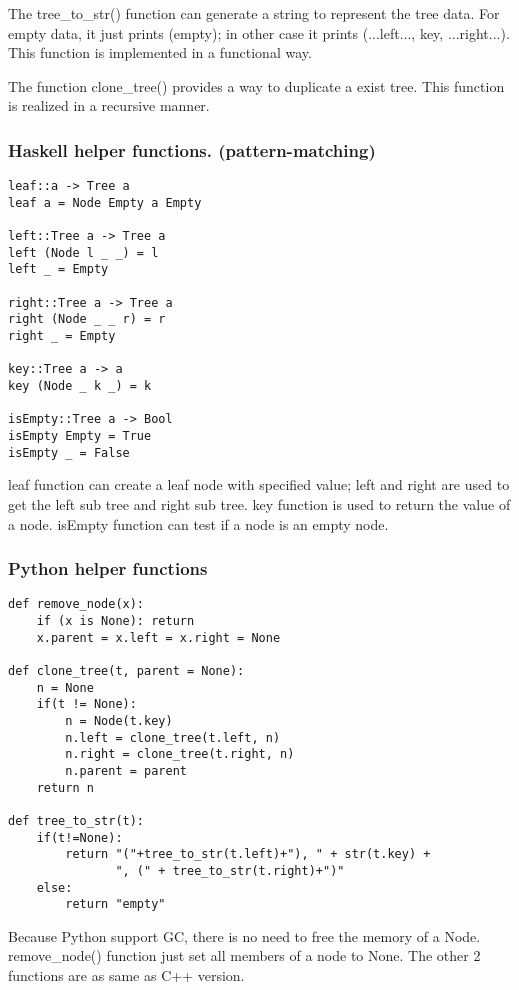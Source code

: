 \documentclass{article}
\begin{document}
The tree\_to\_str() function can generate a string
to represent the tree data. For empty data, it just prints (empty); in other case
it prints (...left..., key, ...right...). This function is implemented in a
functional way.

The function clone\_tree() provides a way to duplicate a exist tree. This
function is realized in a recursive manner.

\subsubsection*{Haskell helper functions. (pattern-matching)}
\lstset{language=Haskell}
\begin{lstlisting}
leaf::a -> Tree a
leaf a = Node Empty a Empty

left::Tree a -> Tree a
left (Node l _ _) = l
left _ = Empty

right::Tree a -> Tree a
right (Node _ _ r) = r
right _ = Empty

key::Tree a -> a
key (Node _ k _) = k

isEmpty::Tree a -> Bool
isEmpty Empty = True
isEmpty _ = False
\end{lstlisting}

leaf function can create a leaf node with specified value; left and right
are used to get the left sub tree and right sub tree. key function is
used to return the value of a node. isEmpty function can test if a node
is an empty node.

\subsubsection*{Python helper functions}
\lstset{language=Python}
\begin{lstlisting}
def remove_node(x):
    if (x is None): return
    x.parent = x.left = x.right = None

def clone_tree(t, parent = None):
    n = None
    if(t != None):
        n = Node(t.key)
        n.left = clone_tree(t.left, n)
        n.right = clone_tree(t.right, n)
        n.parent = parent
    return n

def tree_to_str(t):
    if(t!=None):
        return "("+tree_to_str(t.left)+"), " + str(t.key) + 
               ", (" + tree_to_str(t.right)+")"
    else:
        return "empty"
\end{lstlisting}

Because Python support GC, there is no need to free the memory of a Node.
remove\_node() function just set all members of a node to None. The other
2 functions are as same as C++ version.
\end{document}
